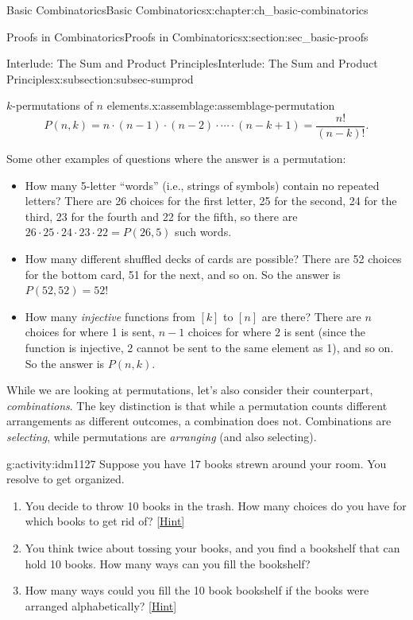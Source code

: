 \documentclass[oneside,10pt,]{book}
\numberwithin{equation}{chapter}
\begin{document}
\begin{chapterptx}{Basic Combinatorics}{}{Basic Combinatorics}{}{}{x:chapter:ch_basic-combinatorics}
\begin{sectionptx}{Proofs in Combinatorics}{}{Proofs in Combinatorics}{}{}{x:section:sec_basic-proofs}
\begin{subsectionptx}{Interlude: The Sum and Product Principles}{}{Interlude: The Sum and Product Principles}{}{}{x:subsection:subsec-sumprod}
\begin{assemblage}{\(k\)-permutations of \(n\) elements.}{x:assemblage:assemblage-permutation}
\begin{equation*}
P(n,k) = n\cdot (n-1) \cdot (n-2) \cdot \cdots \cdot (n-k+1) = \frac{n!}{(n-k)!}.
\end{equation*}
%
\end{assemblage}
Some other examples of questions where the answer is a permutation:%
\begin{itemize}[label=\textbullet]
\item{}How many 5-letter ``words'' (i.e., strings of symbols) contain no repeated letters?  There are 26 choices for the first letter, 25 for the second, 24 for the third, 23 for the fourth and 22 for the fifth, so there are \(26\cdot 25 \cdot 24 \cdot 23 \cdot 22 = P(26,5)\) such words.%
\item{}How many different shuffled decks of cards are possible?  There are 52 choices for the bottom card, 51 for the next, and so on.  So the answer is \(P(52,52) = 52!\)%
\item{}How many \emph{injective} functions from \([k]\) to \([n]\) are there?  There are \(n\) choices for where 1 is sent, \(n-1\) choices for where \(2\) is sent (since the function is injective, 2 cannot be sent to the same element as 1), and so on.  So the answer is \(P(n,k)\).%
\end{itemize}
%
\par
While we are looking at permutations, let's also consider their counterpart, \emph{combinations}. The key distinction is that while a permutation counts different arrangements as different outcomes, a combination does not.  Combinations are \emph{selecting}, while permutations are \emph{arranging} (and also selecting).%
\begin{activity}{}{g:activity:idm1127}%
Suppose you have 17 books strewn around your room.  You resolve to get organized.%
\begin{enumerate}[font=\bfseries,label=(\alph*),ref=\alph*]
\item{}You decide to throw 10 books in the trash.  How many choices do you have for which books to get rid of?%
\space\hspace*{0pt}\hfill{\tiny\hyperlink{g:hint:idm1133-back}{[Hint]}}\item{}You think twice about tossing your books, and you find a bookshelf that can hold 10 books.  How many ways can you fill the bookshelf?%
\item{}How many ways could you fill the 10 book bookshelf if the books were arranged alphabetically?%
\space\hspace*{0pt}\hfill{\tiny\hyperlink{g:hint:idm1140-back}{[Hint]}}\end{enumerate}

\end{activity}
\end{subsectionptx}
\end{sectionptx}
\end{chapterptx}
\end{document}
